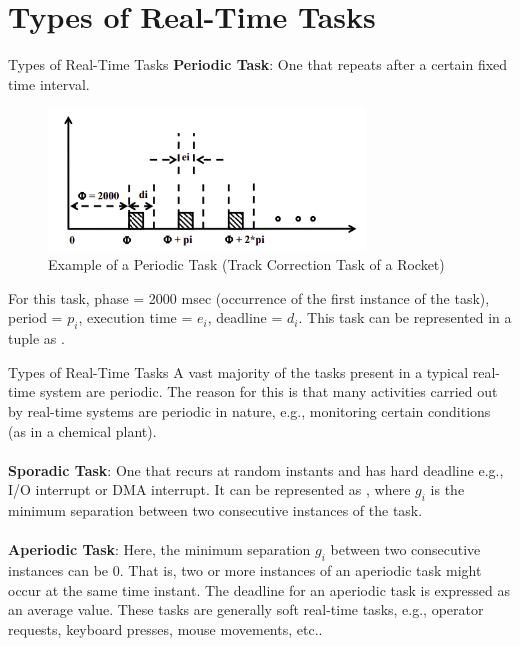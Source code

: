 \documentclass{beamer}
\begin{document}
\section{Types of Real-Time Tasks} 
\begin{frame}{Types of Real-Time Tasks} 
\textbf{Periodic Task}: One that repeats after a certain fixed time interval.
\begin{figure}[h]
    \centering
    \includegraphics[width=0.75\textwidth]{images/periodic-task.png}
    \caption{Example of a Periodic Task (Track Correction Task of a Rocket)}
\end{figure}
For this task, phase = 2000 msec (occurrence of the first instance of the task), period = $p_i$, execution time = $e_i$, deadline = $d_i$. This task can be represented in a tuple as . 
\end{frame}

\begin{frame}{Types of Real-Time Tasks}
    A vast majority of the tasks present in a typical real-time system are periodic. The reason for this is that many activities carried out by real-time systems are periodic in nature, e.g., monitoring certain conditions (as in a chemical plant). \\~\\
    \textbf{Sporadic Task}: One that recurs at random instants and has hard deadline e.g., I/O interrupt or DMA interrupt. It can be represented as , where $g_i$ is the minimum separation between two consecutive instances of the task. \\~\\
    \textbf{Aperiodic Task}: Here, the minimum separation $g_i$ between two consecutive instances can be 0. That is, two or more instances of an aperiodic task might occur at the same time instant. The deadline for an aperiodic task is expressed as an average value. These tasks are generally soft real-time tasks, e.g.,  operator requests, keyboard presses, mouse movements, etc..
\end{frame}
\end{document}
